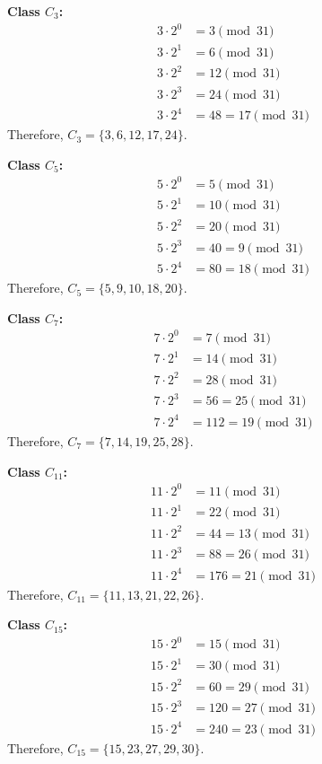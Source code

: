 \documentclass{article}
\begin{document}
\textbf{Class $C_3$:}
\begin{align*}
3 \cdot 2^0 &= 3 \pmod{31} \\
3 \cdot 2^1 &= 6 \pmod{31} \\
3 \cdot 2^2 &= 12 \pmod{31} \\
3 \cdot 2^3 &= 24 \pmod{31} \\
3 \cdot 2^4 &= 48 = 17 \pmod{31}
\end{align*}
Therefore, $C_3 = \{3, 6, 12, 17, 24\}$.

\textbf{Class $C_5$:}
\begin{align*}
5 \cdot 2^0 &= 5 \pmod{31} \\
5 \cdot 2^1 &= 10 \pmod{31} \\
5 \cdot 2^2 &= 20 \pmod{31} \\
5 \cdot 2^3 &= 40 = 9 \pmod{31} \\
5 \cdot 2^4 &= 80 = 18 \pmod{31}
\end{align*}
Therefore, $C_5 = \{5, 9, 10, 18, 20\}$.

\textbf{Class $C_7$:}
\begin{align*}
7 \cdot 2^0 &= 7 \pmod{31} \\
7 \cdot 2^1 &= 14 \pmod{31} \\
7 \cdot 2^2 &= 28 \pmod{31} \\
7 \cdot 2^3 &= 56 = 25 \pmod{31} \\
7 \cdot 2^4 &= 112 = 19 \pmod{31}
\end{align*}
Therefore, $C_7 = \{7, 14, 19, 25, 28\}$.

\textbf{Class $C_{11}$:}
\begin{align*}
11 \cdot 2^0 &= 11 \pmod{31} \\
11 \cdot 2^1 &= 22 \pmod{31} \\
11 \cdot 2^2 &= 44 = 13 \pmod{31} \\
11 \cdot 2^3 &= 88 = 26 \pmod{31} \\
11 \cdot 2^4 &= 176 = 21 \pmod{31}
\end{align*}
Therefore, $C_{11} = \{11, 13, 21, 22, 26\}$.

\textbf{Class $C_{15}$:}
\begin{align*}
15 \cdot 2^0 &= 15 \pmod{31} \\
15 \cdot 2^1 &= 30 \pmod{31} \\
15 \cdot 2^2 &= 60 = 29 \pmod{31} \\
15 \cdot 2^3 &= 120 = 27 \pmod{31} \\
15 \cdot 2^4 &= 240 = 23 \pmod{31}
\end{align*}
Therefore, $C_{15} = \{15, 23, 27, 29, 30\}$.
\end{document}
